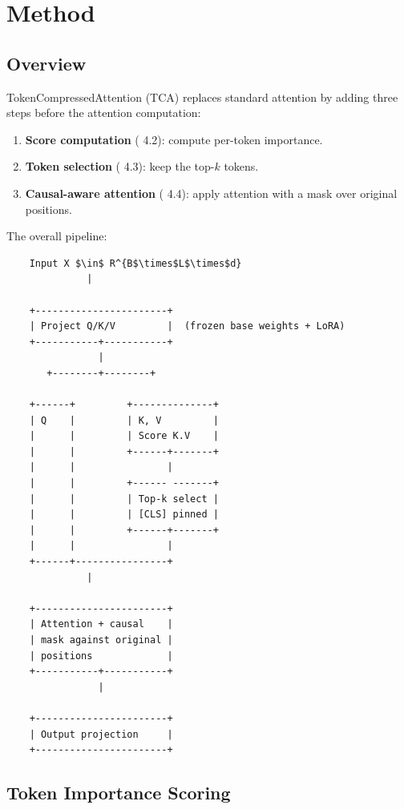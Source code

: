 \section{Method}

\subsection{Overview}

TokenCompressedAttention (TCA) replaces standard attention by adding three 
steps before the attention computation:

\begin{enumerate}
\item \textbf{Score computation} ( 4.2): compute per-token importance.
\item \textbf{Token selection} ( 4.3): keep the top-$k$ tokens.
\item \textbf{Causal-aware attention} ( 4.4): apply attention with a mask over
  original positions.

\end{enumerate}
The overall pipeline:

\begin{lstlisting}
    Input X $\in$ R^{B$\times$L$\times$d}
              |
               
    +-----------------------+
    | Project Q/K/V         |  (frozen base weights + LoRA)
    +-----------+-----------+
                |
       +--------+--------+
                          
    +------+         +--------------+
    | Q    |         | K, V         |
    |      |         | Score K.V    |
    |      |         +------+-------+
    |      |                |
    |      |         +------ -------+
    |      |         | Top-k select |
    |      |         | [CLS] pinned |
    |      |         +------+-------+
    |      |                |
    +------+----------------+
              |
               
    +-----------------------+
    | Attention + causal    |
    | mask against original |
    | positions             |
    +-----------+-----------+
                |
                 
    +-----------------------+
    | Output projection     |
    +-----------------------+
\end{lstlisting}

\subsection{Token Importance Scoring}

